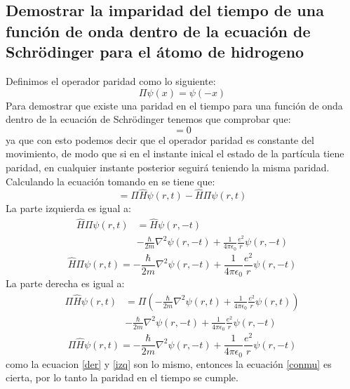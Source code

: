 \documentclass[12pt,letterpaper]{report}
\begin{document}
\subsection*{Demostrar la imparidad del tiempo de una función de onda dentro de la ecuación de Schr\"odinger para el átomo de hidrogeno}
Definimos el operador paridad como lo siguiente:
\begin{equation}
    \Pi\psi(x) = \psi(-x)
    \label{parity}
\end{equation}
Para demostrar que existe una paridad en el tiempo para una función de onda dentro de la ecuación de Schr\"odinger tenemos que comprobar que:
\begin{equation}
    [\Pi,\hat{H}]=0
    \label{conmu}
\end{equation}
ya que con esto podemos decir que el operador paridad es constante del movimiento, de modo que si en el instante inical el estado de la partícula tiene paridad, en cualquier instante posterior seguirá teniendo la misma paridad.\\
Calculando la ecuación \label{conmu} tomando en se tiene que:
\begin{equation*}
[\Pi,\hat{H}]= \Pi\hat{H} \psi(r,t) - \hat{H}\Pi \psi(r,t)
\end{equation*}
La parte izquierda es igual a:
\begin{align*}
\hat{H}\Pi \psi(r,t)    &= \hat{H}\psi(r,-t)\\
                        &-\frac{\hbar}{2m}\nabla^2 \psi(r,-t) +\frac{1}{4\pi \epsilon_0} \frac{e^2}{r} \psi(r,-t)
\end{align*}
\begin{equation}
\hat{H}\Pi \psi(r,t)= -\frac{\hbar}{2m}\nabla^2 \psi(r,-t) +\frac{1}{4\pi \epsilon_0} \frac{e^2}{r} \psi(r,-t)
\label{izq}
\end{equation}
La parte derecha es igual a:
\begin{align*}
    \Pi\hat{H}\psi(r,t)    &=\Pi\left(-\frac{\hbar}{2m}\nabla^2 \psi(r,t) +\frac{1}{4\pi \epsilon_0} \frac{e^2}{r} \psi(r,t)\right)\\
                            &-\frac{\hbar}{2m}\nabla^2 \psi(r,-t) +\frac{1}{4\pi \epsilon_0} \frac{e^2}{r} \psi(r,-t)
    \end{align*}
\begin{equation}
\Pi\hat{H} \psi(r,t)=-\frac{\hbar}{2m}\nabla^2 \psi(r,-t) +\frac{1}{4\pi \epsilon_0} \frac{e^2}{r} \psi(r,-t)
\label{der}
\end{equation}
como la ecuacion \ref{der} y \ref{izq} son lo mismo, entonces la ecuación \ref{conmu} es cierta, por lo tanto la paridad en el tiempo se cumple.
\end{document}
